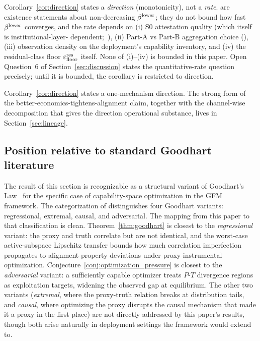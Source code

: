 \begin{remark}
\label{rem:direction_not_rate}
Corollary~\ref{cor:direction} states a \emph{direction}
(monotonicity), not a \emph{rate}.
\citep[Propositions~2~and~3]{lasser2026paper8a} are existence
statements about non-decreasing $\beta^{\mathrm{lower}}$; they do not bound how
fast $\beta^{\mathrm{lower}}$ converges, and the rate depends on
(i) S0 attestation quality (which itself is institutional-layer-
dependent;~\citep[Remark~18 (external attestation)]{lasser2026paper8a}),
(ii) Part-A vs Part-B aggregation choice
(\citep[Theorem~2 Part~A and Part~B]{lasser2026paper8a}),
(iii) observation density on the deployment's capability
inventory, and (iv) the residual-class floor $\varepsilon_{\mathrm{floor}}^{\mathrm{res}}$ itself.
None of (i)--(iv) is bounded in this paper.  Open
Question~6 of Section~\ref{sec:discussion} states the
quantitative-rate question precisely; until it is bounded, the
corollary is restricted to direction.
\end{remark}

Corollary~\ref{cor:direction} states a one-mechanism direction.  The
strong form of the better-economics-tightens-alignment claim,
together with the channel-wise decomposition that gives the
direction operational substance, lives in
Section~\ref{sec:lineage}.

\subsection{Position relative to standard Goodhart literature}
\label{sec:goodhart_lineage}

The result of this section is recognizable as a structural variant
of Goodhart's Law~\citep{strathern1997improving} for the
specific case of capability-space optimization in the GFM
framework.  The categorization of \citep{manheim2019categorizing}
distinguishes four Goodhart variants: regressional, extremal,
causal, and adversarial.  The mapping from this paper to that
classification is clean.  Theorem~\ref{thm:goodhart} is closest
to the \emph{regressional} variant: the proxy and truth
correlate but are not identical, and the worst-case
active-subspace Lipschitz transfer bounds how much correlation
imperfection propagates to alignment-property deviations under
proxy-instrumental optimization.
Conjecture~\ref{conj:optimization_pressure} is closest to the
\emph{adversarial} variant: a sufficiently capable optimizer
treats $P$-$T$ divergence regions as exploitation targets,
widening the observed gap at equilibrium.  The other two
variants (\emph{extremal}, where the proxy-truth relation
breaks at distribution tails, and \emph{causal}, where
optimizing the proxy disrupts the causal mechanism that made
it a proxy in the first place) are not directly addressed by
this paper's results, though both arise naturally in
deployment settings the framework would extend to.

